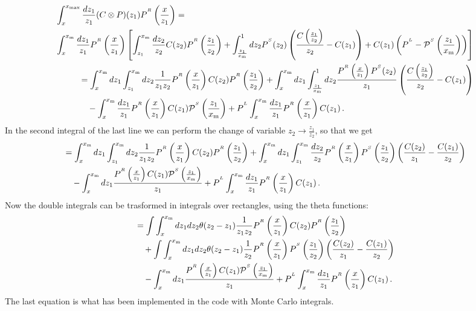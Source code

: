 \documentclass[a4paper]{article}
\newcommand{\PR}[0]{P^{^R}}
\newcommand{\PS}[0]{P^{^S}}
\newcommand{\PmS}[0]{\mathcal{P}^{^S}}
\newcommand{\PL}[0]{P^{^L}}
\newcommand{\xm}[0]{x_{\rm m}}
\newcommand{\zo}[0]{{z_1}}
\newcommand{\zt}[0]{{z_2}}
\begin{document}
\begin{align}
	\begin{split}
		& \int_x^{x_{\rm max}} \frac{dz_1}{z_1} (C \otimes P)(z_1) \PR \left(\frac{x}{z_1}\right)  = \\
		&\int_x^{\xm} \frac{dz_1}{z_1}\PR\left(\frac{x}{z_1}\right) \left[ \int_{\zo}^{\xm} \frac{d\zt}{\zt}C(\zt)\PR\left(\frac{\zo}{\zt}\right) +  \int_{\frac{\zo}{\xm}}^{1}d\zt \PS(\zt)\left(\frac{C\left(\frac{\zo}{\zt}\right)}{\zt}-C(\zo)\right) + C(\zo)\left(\PL - \PmS\left(\frac{\zo}{\xm}\right)\right)\right]\\
	\end{split}\notag \\
	\begin{split}
		&= \int_x^{\xm}d\zo \int_{\zo}^{\xm}d\zt \frac{1}{\zo \zt} \PR \left(\frac{x}{\zo}\right)C(\zt)\PR \left(\frac{\zo}{\zt}\right) + \int_x^{\xm}d\zo \int_{\frac{\zo}{\xm}}^{1}d\zt \frac{\PR\left(\frac{x}{\zo}\right)\PS(\zt)}{\zo} \left( \frac{C\left(\frac{\zo}{\zt}\right)}{\zt} - C(\zo) \right) \\
		&\quad -\int_x^{\xm}\frac{d\zo}{\zo} \PR\left(\frac{x}{\zo}\right) C(\zo)\PmS\left(\frac{\zo}{\xm}\right) + \PL \int_x^{\xm} \frac{d\zo}{\zo} \PR\left(\frac{x}{\zo}\right) C(\zo) \,.
	\end{split}
\end{align}
In the second integral of the last line we can perform the change of variable $z_2 \rightarrow \frac{\zo}{\zt}$, so that we get
\begin{equation}
	\begin{split}
		&= \int_x^{\xm}d\zo \int_{\zo}^{\xm}d\zt \frac{1}{\zo \zt} \PR \left(\frac{x}{\zo}\right)C(\zt)\PR \left(\frac{\zo}{\zt}\right) +\int_x^{\xm}d\zo \int_{\zo}^{\xm}\frac{d\zt}{\zt} \PR\left(\frac{x}{\zo}\right)\PS\left(\frac{\zo}{\zt}\right) \left( \frac{C(\zt)}{\zo} - \frac{C(\zo)}{\zt} \right) \\
		&\quad-\int_x^{\xm}d\zo \frac{\PR\left(\frac{x}{\zo}\right) C(\zo)\PmS\left(\frac{\zo}{\xm}\right)}{\zo} + \PL \int_x^{\xm} \frac{d\zo}{\zo} \PR\left(\frac{x}{\zo}\right) C(\zo)\,.
	\end{split}
\end{equation}
Now the double integrals can be trasformed in integrals over rectangles, using the theta functions:
\begin{equation}
	\begin{split}
		&= \int\int_x^{\xm}d\zo d\zt \theta(\zt-\zo)\frac{1}{\zo \zt} \PR \left(\frac{x}{\zo}\right)C(\zt)\PR \left(\frac{\zo}{\zt}\right) \\
		& \quad+\int\int_x^{\xm}d\zo d\zt \theta(\zt-\zo)\frac{1}{\zt} \PR\left(\frac{x}{\zo}\right)\PS\left(\frac{\zo}{\zt}\right) \left( \frac{C(\zt)}{\zo} - \frac{C(\zo)}{\zt} \right) \\
		&\quad-\int_x^{\xm}d\zo \frac{\PR\left(\frac{x}{\zo}\right) C(\zo)\PmS\left(\frac{\zo}{\xm}\right)}{\zo} + \PL \int_x^{\xm} \frac{d\zo}{\zo} \PR\left(\frac{x}{\zo}\right) C(\zo)\,.
	\end{split}
\end{equation}
The last equation is what has been implemented in the code with Monte Carlo integrals.
\end{document}
